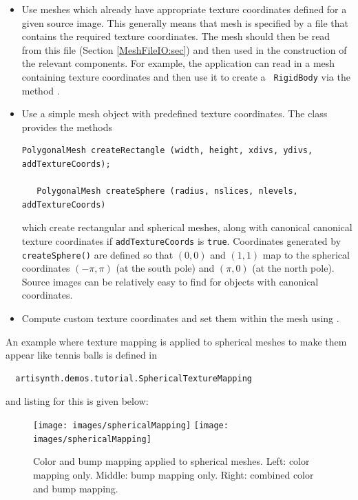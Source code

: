 \begin{itemize}

\item Use meshes which already have appropriate texture coordinates
defined for a given source image. This generally means that mesh is
specified by a file that contains the required texture coordinates.
The mesh should then be read from this file (Section
\ref{MeshFileIO:sec}) and then used in the construction of the
relevant components. For example, the application can read in a mesh
containing texture coordinates and then use it to create a {\tt
RigidBody} via the method
.

\item Use a simple mesh object with predefined
texture coordinates. The class 
provides the methods
\begin{lstlisting}[]
   PolygonalMesh createRectangle (width, height, xdivs, ydivs, addTextureCoords);
  
   PolygonalMesh createSphere (radius, nslices, nlevels, addTextureCoords)
\end{lstlisting}
%
which create rectangular and spherical meshes, along with canonical
canonical texture coordinates if {\tt addTextureCoords} is {\tt true}.
Coordinates generated by {\tt createSphere()} are defined so that
$(0,0)$ and $(1,1)$ map to the spherical coordinates $(-\pi,\pi)$ (at
the south pole) and $(\pi,0)$ (at the north pole). Source images can
be relatively easy to find for objects with canonical coordinates.

\item Compute custom texture coordinates and set them within the mesh
using .

\end{itemize}

An example where texture mapping is applied to spherical meshes to
make them appear like tennis balls is defined in
%
\begin{verbatim}
  artisynth.demos.tutorial.SphericalTextureMapping
\end{verbatim}
%
and listing for this is given below:

\begin{figure}[ht]
\begin{center}
\iflatexml
 \texttt{[image: images/sphericalMapping]}
\else
 \texttt{[image: images/sphericalMapping]}
\fi
\end{center}
\caption{Color and bump mapping applied to spherical meshes. Left:
color mapping only. Middle: bump mapping only. Right: combined color
and bump mapping.}
\label{sphericalMapping:fig}
\end{figure}

